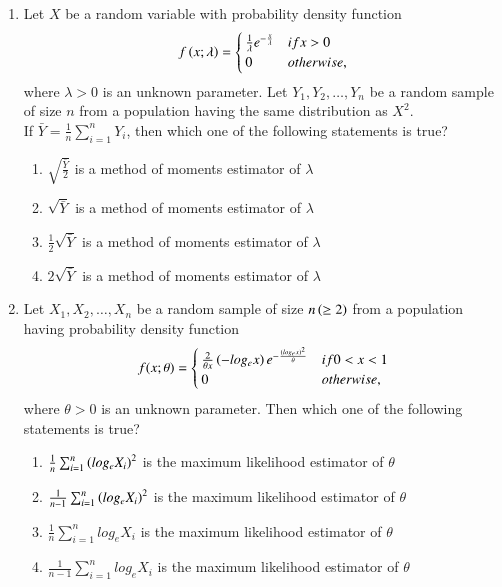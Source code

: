 \documentclass[journal]{IEEEtran}
\begin{document}
\begin{enumerate}
\item Let $X$ be a random variable with probability density function
\begin{align*}
f\left(x; \lambda\right) = \begin{cases} 
      \frac{1}{\lambda} e^{-\frac{x}{\lambda} }& if x > 0\\ 
      0 & otherwise, 
   \end{cases}
\end{align*}
where $\lambda > 0$ is an unknown parameter. Let $Y_1, Y_2, \ldots, Y_n$ be a random sample of size $n$ from a population having the same distribution as $X^2$.\\
If $\bar{Y} = \frac{1}{n} \sum_{i=1}^{n} Y_i$, then which one of the following statements is true?
\begin{enumerate}
    \item $\sqrt{\frac{\bar{Y}}{2}}$ is a method of moments estimator of $\lambda$
    \item $\sqrt{\bar{Y}}$ is a method of moments estimator of $\lambda$
    \item $\frac{1}{2} \sqrt{\bar{Y}}$ is a method of moments estimator of $\lambda$
    \item $2 \sqrt{\bar{Y}}$ is a method of moments estimator of $\lambda$
\end{enumerate}

\item Let $X_1, X_2, \ldots, X_n$ be a random sample of size $n \left(\geq 2\right)$ from a population having probability density function
\begin{align*}
f(x; \theta) = \begin{cases} 
      \frac{2}{\theta x} \left(-log_e x\right) e^{-\frac{\left(log_e x\right)^2}{\theta}}  & if 0 < x < 1 \\ 
      0 & otherwise, 
   \end{cases}
\end{align*}
where $\theta > 0$ is an unknown parameter. Then which one of the following statements is true?

\begin{enumerate}
    \item $\frac{1}{n}\sum_{i=1}^n \left(log_e X_i\right)^2$ is the maximum likelihood estimator of $\theta$
    \item $\frac{1}{n-1}\sum_{i=1}^n \left(log_e X_i\right)^2$ is the maximum likelihood estimator of $\theta$
    \item $\frac{1}{n} \sum_{i=1}^n log_e X_i$ is the maximum likelihood estimator of $\theta$
    \item $\frac{1}{n-1} \sum_{i=1}^n log_e X_i$ is the maximum likelihood estimator of $\theta$
\end{enumerate}


\end{enumerate}
\end{document}
